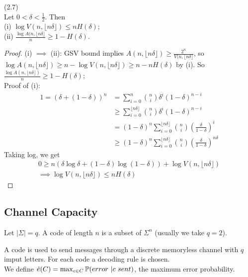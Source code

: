 \documentclass[a4paper]{article}
\begin{document}
\begin{prop} (2.7)\\
Let $0 < \delta < \frac{1}{2}$. Then\\
(i) $\log V(n,\lfloor n\delta\rfloor) \leq nH(\delta)$;\\
(ii) $\frac{\log A(n,\lfloor n\delta\rfloor}{n} \geq 1-H(\delta)$.
\begin{proof}
(i) $\implies$ (ii): GSV bound implies $A(n,\lfloor n\delta\rfloor) \geq \frac{2^n}{V(n,\lfloor n\delta \rfloor}$, so $\log A(n,\lfloor n\delta\rfloor) \geq n-\log V(n,\lfloor n\delta \rfloor) \geq n-nH(\delta)$ by (i). So $\frac{\log A(n,\lfloor n\delta\rfloor)}{n} \geq 1-H(\delta)$;\\
Proof of (i):
\begin{equation*}
\begin{aligned}
1 = (\delta + (1-\delta))^n &= \sum_{i=0}^n {n\choose i} \delta^i (1-\delta)^{n-i}\\
&\geq \sum_{i=0}^{\lfloor n\delta\rfloor} {n \choose i} \delta^i (1-\delta)^{n-i}\\
&= (1-\delta)^n \sum_{i=0}^{\lfloor n\delta\rfloor} {n \choose i} (\frac{\delta}{1-\delta})^i\\
&\geq (1-\delta)^n \sum_{i=0}^{\lfloor n\delta\rfloor} {n \choose i} (\frac{\delta}{1-\delta})^{n\delta}
\end{aligned}
\end{equation*}
Taking log, we get
\begin{equation*}
\begin{aligned}
0 \geq n(\delta\log\delta + (1-\delta) \log(1-\delta)) + \log V(n,\lfloor n\delta\rfloor)\\
\implies \log V(n,\lfloor n\delta \rfloor) \leq nH(\delta)
\end{aligned}
\end{equation*}
\end{proof}
\end{prop}

\subsection{Channel Capacity}
Let $|\Sigma| =q$. A code of length $n$ is a subset of $\Sigma^n$ (usually we take $q=2$).

A code is used to send messages through a discrete memoryless channel with $q$ imput letters. For each code a decoding rule is chosen.\\
We define $\hat{e}(C) = \max_{c \in C} \P(error\ | c\ sent)$, the maximum error probability.
\end{document}
